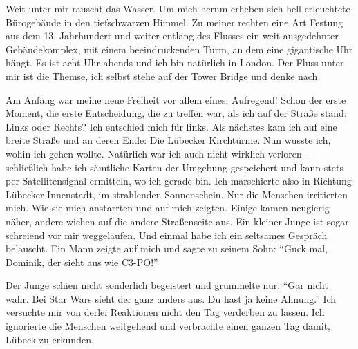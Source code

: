 Weit unter mir rauscht das Wasser. Um mich herum erheben sich hell erleuchtete Bürogebäude in den tiefschwarzen Himmel. Zu meiner rechten eine Art Festung aus dem 13. Jahrhundert und weiter entlang des Flusses ein weit ausgedehnter Gebäudekomplex, mit einem beeindruckenden Turm, an dem eine gigantische Uhr hängt. Es ist acht Uhr abends und ich bin natürlich in London. Der Fluss unter mir ist die Themse, ich selbst stehe auf der Tower Bridge und denke nach.

Am Anfang war meine neue Freiheit vor allem eines: Aufregend! Schon der erste Moment, die erste Entscheidung, die zu treffen war, als ich auf der Straße stand: Links oder Rechts? Ich entschied mich für links. Als nächstes kam ich auf eine breite Straße und an deren Ende: Die Lübecker Kirchtürme. Nun wusste ich, wohin ich gehen wollte. Natürlich war ich auch nicht wirklich verloren — schließlich habe ich sämtliche Karten der Umgebung gespeichert und kann stets per Satellitensignal ermitteln, wo ich gerade bin. Ich marschierte also in Richtung Lübecker Innenstadt, im strahlenden Sonnenschein. Nur die Menschen irritierten mich. Wie sie mich anstarrten und auf mich zeigten. Einige kamen neugierig näher, andere wichen auf die andere Straßenseite aus. Ein kleiner Junge ist sogar schreiend vor mir weggelaufen. Und einmal habe ich ein seltsames Gespräch belauscht. Ein Mann zeigte auf mich und sagte zu seinem Sohn: "`Guck mal, Dominik, der sieht aus wie C3-PO!"'

Der Junge schien nicht sonderlich begeistert und grummelte nur: "`Gar nicht wahr. Bei Star Wars sieht der ganz anders aus. Du hast ja keine Ahnung."' Ich versuchte mir von derlei Reaktionen nicht den Tag verderben zu lassen. Ich ignorierte die Menschen weitgehend und verbrachte einen ganzen Tag damit, Lübeck zu erkunden.

